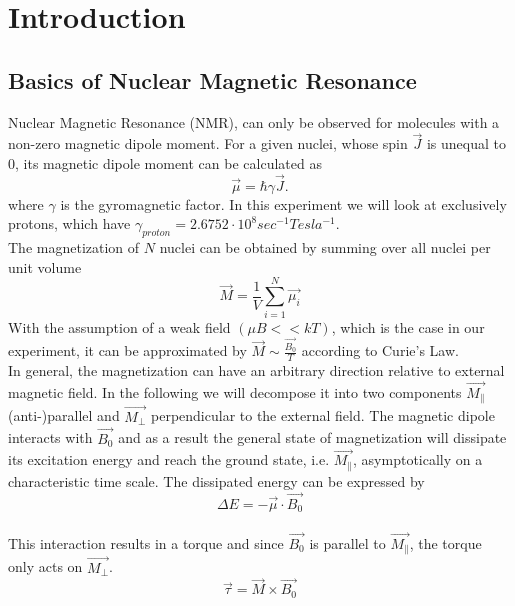 \section{Introduction}\label{intro}
\subsection{Basics of Nuclear Magnetic Resonance}\label{basics}
Nuclear Magnetic Resonance (NMR), can only be observed for molecules with a non-zero magnetic dipole moment. For a given nuclei, whose spin $\vec{J}$ is unequal to 0, its magnetic dipole moment can be calculated as
\begin{equation}
	\label{1}
	\vec{\mu} = \hbar \gamma \vec{J}.
\end{equation}
where $\gamma$ is the gyromagnetic factor. In this experiment we will look at exclusively protons, which have $\gamma_{proton} = 2.6752 \cdot 10^8 sec^{-1} Tesla^{-1}$.
\vspace{3mm} \\
The magnetization of $N$ nuclei can be obtained by summing over all nuclei per unit volume
\begin{equation}
	\label{2}
	\vec{M} = \dfrac{1}{V} \sum^{N}_{i=1} \vec{\mu_i}
\end{equation}
With the assumption of a weak field $(\mu B << kT)$, which is the case in our experiment, it can be approximated by $\vec{M} \sim \frac{\vec{B_{0}}}{T}$ according to Curie's Law. 
\vspace{5mm} \\
In general, the magnetization can have an arbitrary direction relative to external magnetic field. In the following we will decompose it into two components $\vec{M_{\parallel}}$ (anti-)parallel and $\vec{M_{\perp}}$ perpendicular to the external field. 
The magnetic dipole interacts with $\vec{B_{0}}$ and as a result the general state of magnetization will dissipate its excitation energy and reach the ground state, i.e. $\vec{M_{\parallel}}$, asymptotically on a characteristic time scale. The dissipated energy can be expressed by
\begin{equation}
	\label{5}
	\Delta E = - \vec{\mu} \cdot \vec{B_0}
\end{equation}
\vspace{3mm} \\
This interaction results in a torque and since $\vec{B_{0}}$ is parallel to $\vec{M_{\parallel}}$, the torque only acts on $\vec{M_{\perp}}$.
\begin{equation}
	\label{6}
	\vec{\tau} = \vec{M} \times \vec{B_{0}}
\end{equation}
